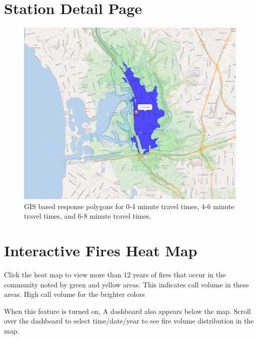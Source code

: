 \documentclass[12pt,oneside]{book}
\begin{document}
\section{Station Detail Page}

\begin{figure}[ht!]
\centering
\includegraphics[width=.9\columnwidth]{Figures/response_area}
\caption{GIS based response polygons for 0-4 minute travel times, 4-6 minute travel times, and 6-8 minute travel times.}
\label{fig:response_area}
\end{figure}

\section{Interactive Fires Heat Map}

Click the heat map to view more than 12 years of fires that occur in the community noted by green and yellow areas. This indicates call volume in these areas. High call volume for the brighter colors 

When this feature is turned on, A dashboard also appears below the map. Scroll over the dashboard to select time/date/year to see fire volume distribution in the map. 
\end{document}
